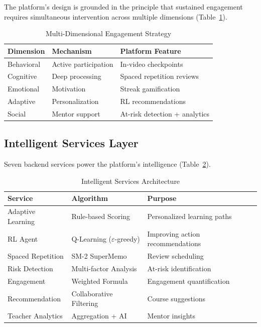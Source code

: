 \documentclass[conference]{IEEEtran}
\begin{document}
The platform's design is grounded in the principle that sustained engagement requires simultaneous intervention across multiple dimensions (Table~\ref{tab:engagement_dimensions}).

\begin{table}[htbp]
\caption{Multi-Dimensional Engagement Strategy}
\label{tab:engagement_dimensions}
\centering
\begin{tabular}{p{2.2cm}p{2.5cm}p{2.8cm}}
\toprule
\textbf{Dimension} & \textbf{Mechanism} & \textbf{Platform Feature} \\
\midrule
Behavioral & Active participation & In-video checkpoints \\
Cognitive & Deep processing & Spaced repetition reviews \\
Emotional & Motivation & Streak gamification \\
Adaptive & Personalization & RL recommendations \\
Social & Mentor support & At-risk detection + analytics \\
\bottomrule
\end{tabular}
\end{table}

\subsection{Intelligent Services Layer}

Seven backend services power the platform's intelligence (Table~\ref{tab:services}).

\begin{table}[htbp]
\caption{Intelligent Services Architecture}
\label{tab:services}
\centering
\begin{tabular}{p{2.5cm}p{2cm}p{2.8cm}}
\toprule
\textbf{Service} & \textbf{Algorithm} & \textbf{Purpose} \\
\midrule
Adaptive Learning & Rule-based Scoring & Personalized learning paths \\
RL Agent & Q-Learning ($\varepsilon$-greedy) & Improving action recommendations \\
Spaced Repetition & SM-2 SuperMemo & Review scheduling \\
Risk Detection & Multi-factor Analysis & At-risk identification \\
Engagement & Weighted Formula & Engagement quantification \\
Recommendation & Collaborative Filtering & Course suggestions \\
Teacher Analytics & Aggregation + AI & Mentor insights \\
\bottomrule
\end{tabular}
\end{table}
\end{document}
